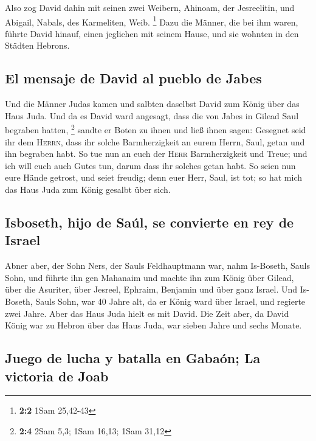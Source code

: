  Also zog David dahin mit seinen zwei Weibern, Ahinoam,
der Jesreelitin, und Abigail, Nabals, des Karmeliten, Weib. \footnote{\textbf{2:2}
  1Sam 25,42-43}  Dazu die Männer, die bei ihm waren,
führte David hinauf, einen jeglichen mit seinem Hause, und sie wohnten
in den Städten Hebrons.

\hypertarget{el-mensaje-de-david-al-pueblo-de-jabes}{%
\subsection{El mensaje de David al pueblo de
Jabes}\label{el-mensaje-de-david-al-pueblo-de-jabes}}

 Und die Männer Judas kamen und salbten daselbst David zum
König über das Haus Juda. Und da es David ward angesagt, dass die von
Jabes in Gilead Saul begraben hatten, \footnote{\textbf{2:4} 2Sam 5,3;
  1Sam 16,13; 1Sam 31,12}  sandte er Boten zu ihnen und
ließ ihnen sagen: Gesegnet seid ihr dem \textsc{Herrn}, dass ihr solche
Barmherzigkeit an eurem Herrn, Saul, getan und ihn begraben habt.
 So tue nun an euch der \textsc{Herr} Barmherzigkeit und
Treue; und ich will euch auch Gutes tun, darum dass ihr solches getan
habt.  So seien nun eure Hände getrost, und seiet freudig;
denn euer Herr, Saul, ist tot; so hat mich das Haus Juda zum König
gesalbt über sich.

\hypertarget{isboseth-hijo-de-sauxfal-se-convierte-en-rey-de-israel}{%
\subsection{Isboseth, hijo de Saúl, se convierte en rey de
Israel}\label{isboseth-hijo-de-sauxfal-se-convierte-en-rey-de-israel}}

 Abner aber, der Sohn Ners, der Sauls Feldhauptmann war,
nahm Is-Boseth, Sauls Sohn, und führte ihn gen Mahanaim 
und machte ihn zum König über Gilead, über die Asuriter, über Jesreel,
Ephraim, Benjamin und über ganz Israel.  Und Is-Boseth,
Sauls Sohn, war 40 Jahre alt, da er König ward über Israel, und regierte
zwei Jahre. Aber das Haus Juda hielt es mit David.  Die
Zeit aber, da David König war zu Hebron über das Haus Juda, war sieben
Jahre und sechs Monate.

\hypertarget{juego-de-lucha-y-batalla-en-gabauxf3n-la-victoria-de-joab}{%
\subsection{Juego de lucha y batalla en Gabaón; La victoria de
Joab}\label{juego-de-lucha-y-batalla-en-gabauxf3n-la-victoria-de-joab}}

